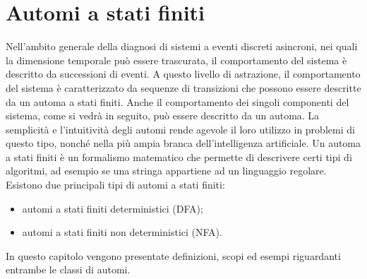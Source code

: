 \chapter{Automi a stati finiti}
Nell'ambito generale della diagnosi di sistemi a eventi discreti asincroni, nei quali la dimensione temporale può essere trascurata, il comportamento del sistema è descritto da successioni di eventi. A questo livello di astrazione, il comportamento del sistema è caratterizzato da sequenze di transizioni che possono essere descritte da un automa a stati finiti. Anche il comportamento dei singoli componenti del sistema, come si vedrà in seguito, può essere descritto da un automa. La semplicità e l'intuitività degli automi rende agevole il loro utilizzo in problemi di questo tipo, nonché nella più ampia branca dell'intelligenza artificiale.
Un automa a stati finiti è un formalismo matematico che permette di descrivere certi tipi di algoritmi, ad esempio se una stringa appartiene ad un linguaggio regolare.
Esistono due principali tipi di automi a stati finiti:
\begin{itemize}
\item automi a stati finiti deterministici (DFA);
\item automi a stati finiti non deterministici (NFA).
\end{itemize}
In questo capitolo vengono presentate definizioni, scopi ed esempi riguardanti entrambe le classi di automi.

